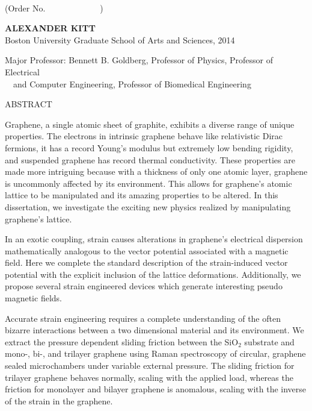 \begin{center}

\textbf{\thesistitle}\\

(Order No.\ \ \ \ \ \ \ \ \ \ \ \ \ )

\textbf{ALEXANDER KITT}\\
Boston University Graduate School of Arts and Sciences, 2014\\
\begin{singlespace}
	Major Professor: Bennett B. Goldberg, Professor of Physics, Professor of Electrical \\
	\qquad \qquad \qquad \quad \ \ and Computer Engineering, Professor of Biomedical Engineering
\end{singlespace}

ABSTRACT

\end{center}
\vspace{-15 pt}  %

Graphene, a single atomic sheet of graphite, exhibits a diverse range of unique properties.
The electrons in intrinsic graphene behave like relativistic Dirac fermions, it has a record Young's modulus but extremely low bending rigidity, and suspended graphene has record thermal conductivity.
These properties are made more intriguing because with a thickness of only one atomic layer, graphene is uncommonly affected by its environment.
This allows for graphene's atomic lattice to be manipulated and its amazing properties to be altered.
In this dissertation, we investigate the exciting new physics realized by manipulating graphene's lattice.

In an exotic coupling, strain causes alterations in graphene's electrical dispersion mathematically analogous to the vector potential associated with a magnetic field.
Here we complete the standard description of the strain-induced vector potential with the explicit inclusion of the lattice deformations.
Additionally, we propose several strain engineered devices which generate interesting pseudo magnetic fields.

Accurate strain engineering requires a complete understanding of the often bizarre interactions between a two dimensional material and its environment.
We extract the pressure dependent sliding friction between the SiO$_2$ substrate and mono-, bi-, and trilayer graphene using Raman spectroscopy of circular, graphene sealed microchambers under variable external pressure.
The sliding friction for trilayer graphene behaves normally, scaling with the applied load, whereas the friction for monolayer and bilayer graphene is anomalous, scaling with the inverse of the strain in the graphene.

